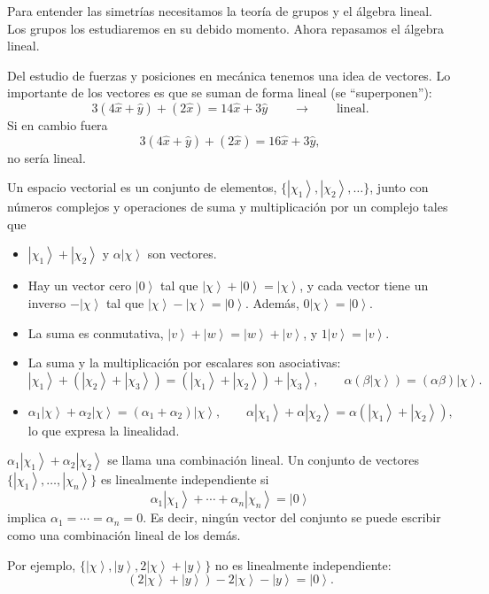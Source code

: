 \documentclass[11pt,a4paper]{article}
\newcommand{\concept}[1]{\textcolor{concept-green}{#1}}
\newcommand{\ket}[1]{\left|#1\right\rangle}
\begin{document}
Para entender las simetrías necesitamos la teoría de grupos y el álgebra lineal. Los grupos los estudiaremos en su debido momento. Ahora repasamos el álgebra lineal.

Del estudio de fuerzas y posiciones en mecánica tenemos una idea de vectores. Lo importante de los vectores es que se suman de forma lineal (se ``superponen''):
\[
  3(4\hat x+\hat y)+(2\hat x)=14\hat x+3\hat y
  \qquad\longrightarrow\qquad \text{lineal}.
\]
Si en cambio fuera
\[
  3(4\hat x+\hat y)+(2\hat x)=16\hat x+3\hat y,
\]
no sería lineal.

Un \concept{espacio vectorial} es un conjunto de elementos, $\{\ket{\chi_1},\ket{\chi_2},\ldots\}$, junto con números complejos y operaciones de suma y multiplicación por un complejo tales que

\begin{itemize}
  \item $\ket{\chi_1}+\ket{\chi_2}$ y $\alpha\ket{\chi}$ son vectores.

  \item Hay un vector cero $\ket{0}$ tal que $\ket{\chi}+\ket{0}=\ket{\chi}$, y cada vector tiene un inverso $-\ket{\chi}$ tal que $\ket{\chi}-\ket{\chi}=\ket{0}$. Además, $0\ket{\chi}=\ket{0}$.

  \item La suma es conmutativa, $\ket v+\ket w=\ket w+\ket v$, y
  $1\ket v=\ket v$.

  \item La suma y la multiplicación por escalares son asociativas:
  \[
    \ket{\chi_1}+(\ket{\chi_2}+\ket{\chi_3})
    =(\ket{\chi_1}+\ket{\chi_2})+\ket{\chi_3},
    \qquad
    \alpha(\beta\ket{\chi})=(\alpha\beta)\ket{\chi}.
  \]

  \item
  \[
    \alpha_1\ket{\chi}+\alpha_2\ket{\chi}
      =(\alpha_1+\alpha_2)\ket{\chi},
    \qquad
    \alpha\ket{\chi_1}+\alpha\ket{\chi_2}
      =\alpha(\ket{\chi_1}+\ket{\chi_2}),
  \]
  lo que expresa la \concept{linealidad}.
\end{itemize}

$\alpha_1\ket{\chi_1}+\alpha_2\ket{\chi_2}$ se llama una \concept{combinación lineal}. Un conjunto de vectores $\{\ket{\chi_1},\ldots,\ket{\chi_n}\}$ es \concept{linealmente independiente} si
\[
  \alpha_1\ket{\chi_1}+\cdots+\alpha_n\ket{\chi_n}=\ket{0}
\]
implica $\alpha_1=\cdots=\alpha_n=0$. Es decir, ningún vector del conjunto se puede escribir como una combinación lineal de los demás.

Por ejemplo, $\{\ket{\chi},\ket{y},2\ket{\chi}+\ket{y}\}$ no es linealmente independiente:
\[
  (2\ket{\chi}+\ket{y})-2\ket{\chi}-\ket{y}=\ket{0}.
\]
\end{document}

